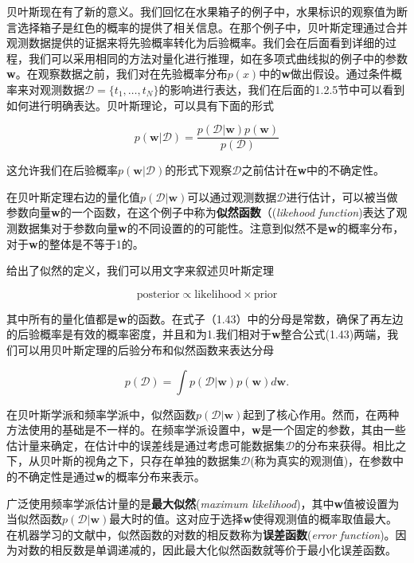 	 贝叶斯现在有了新的意义。我们回忆在水果箱子的例子中，水果标识的观察值为断言选择箱子是红色的概率的提供了相关信息。在那个例子中，贝叶斯定理通过合并观测数据提供的证据来将先验概率转化为后验概率。我们会在后面看到详细的过程，我们可以采用相同的方法对量化进行推理，如在多项式曲线拟的例子中的参数\textbf{w}。在观察数据之前，我们对在先验概率分布$p(x)$中的\textbf{w}做出假设。通过条件概率来对观测数据$\mathcal{D} = \{ t_1, \dots, t_N \}$的影响进行表达，我们在后面的1.2.5节中可以看到如何进行明确表达。贝叶斯理论，可以具有下面的形式
	 
	 \begin{equation}
	 p(\textbf{w} | \mathcal{D}) = \frac{p(\mathcal{D} | \textbf{w})p(\textbf{w})}{p(\mathcal{D})}
	 \end{equation}
	 
	 这允许我们在后验概率$p(\textbf{w}|\mathcal{D})$的形式下观察$\mathcal{D}$之前估计在\textbf{w}中的不确定性。
	 
	 在贝叶斯定理右边的量化值$p(\mathcal{D} | \textbf{w})$可以通过观测数据$\mathcal{D}$进行估计，可以被当做参数向量\textbf{w}的一个函数，在这个例子中称为\textbf{似然函数}（(\textit{likehood function})表达了观测数据集对于参数向量\textbf{w}的不同设置的的可能性。注意到似然不是\textbf{w}的概率分布，对于\textbf{w}的整体是不等于1的。
	 
	 给出了似然的定义，我们可以用文字来叙述贝叶斯定理
	 
	 \begin{equation}
	 \mathrm{posterior \propto likelihood \times prior}
	 \end{equation}
	 
	 其中所有的量化值都是\textbf{w}的函数。在式子（1.43）中的分母是常数，确保了再左边的后验概率是有效的概率密度，并且和为1.我们相对于\textbf{w}整合公式(1.43)两端，我们可以用贝叶斯定理的后验分布和似然函数来表达分母
	 
	 \begin{equation}
	 p(\mathcal{D}) = \int p(\mathcal{D} | \textbf{w}) p(\textbf{w}) d\textbf{w}.
	 \end{equation}
	 
	 在贝叶斯学派和频率学派中，似然函数$p(\mathcal{D} | \textbf{w})$起到了核心作用。然而，在两种方法使用的基础是不一样的。在频率学派设置中，\textbf{w}是一个固定的参数，其由一些估计量来确定，在估计中的误差线是通过考虑可能数据集$\mathcal{D}$的分布来获得。相比之下，从贝叶斯的视角之下，只存在单独的数据集$\mathcal{D}$(称为真实的观测值)，在参数中的不确定性是通过\textbf{w}的概率分布来表示。
	 
	 广泛使用频率学派估计量的是\textbf{最大似然}(\textit{maximum likelihood})，其中\textbf{w}值被设置为当似然函数$p(\mathcal{D} | \textbf{w})$最大时的值。这对应于选择\textbf{w}使得观测值的概率取值最大。在机器学习的文献中，似然函数的对数的相反数称为\textbf{误差函数}(\textit{error function})。因为对数的相反数是单调递减的，因此最大化似然函数就等价于最小化误差函数。
	 
